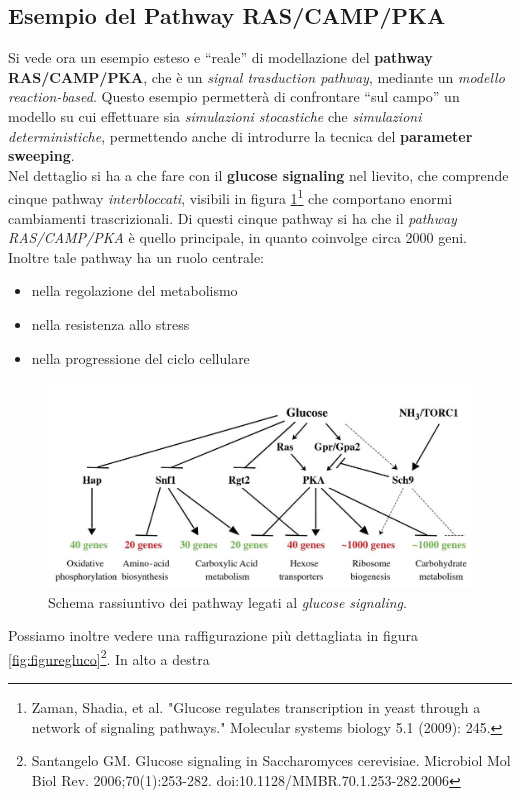 \documentclass[a4paper,12pt, oneside]{book}
\begin{document}
\subsection{Esempio del Pathway RAS/CAMP/PKA}
Si vede ora un esempio esteso e ``reale'' di modellazione del \textbf{pathway
  RAS/CAMP/PKA}, che è un \textit{signal trasduction pathway}, mediante un
\textit{modello reaction-based}. Questo esempio 
permetterà di confrontare ``sul campo'' un modello su cui effettuare sia
\textit{simulazioni stocastiche} che \textit{simulazioni deterministiche},
permettendo anche di introdurre la tecnica del \textbf{parameter sweeping}.\\
Nel dettaglio si ha a che fare con il \textbf{glucose signaling} nel lievito,
che comprende cinque pathway \textit{interbloccati}, visibili in figura
\ref{fig:gluco}\footnote{Zaman, Shadia, et al. "Glucose regulates transcription
  in yeast through a network of signaling pathways." Molecular systems biology
  5.1 (2009): 245.} che comportano enormi
cambiamenti trascrizionali. Di questi cinque pathway si ha che il
\textit{pathway RAS/CAMP/PKA} è quello principale, in quanto coinvolge circa
2000 geni. Inoltre tale pathway ha un ruolo centrale:
\begin{itemize}
  \item nella regolazione del metabolismo
  \item nella resistenza allo stress
  \item nella progressione del ciclo cellulare
\end{itemize}
\begin{figure}
  \centering
  \includegraphics[scale = 0.25]{img/gluco.jpg}
  \caption{Schema rassiuntivo dei pathway legati al \textit{glucose signaling}.}
  \label{fig:gluco}
\end{figure}
Possiamo inoltre vedere una raffigurazione più dettagliata in figura
\ref{fig:figuregluco}\footnote{Santangelo GM. Glucose signaling in Saccharomyces
  cerevisiae. Microbiol Mol Biol
  Rev. 2006;70(1):253-282. doi:10.1128/MMBR.70.1.253-282.2006}. In alto a destra
\end{document}
